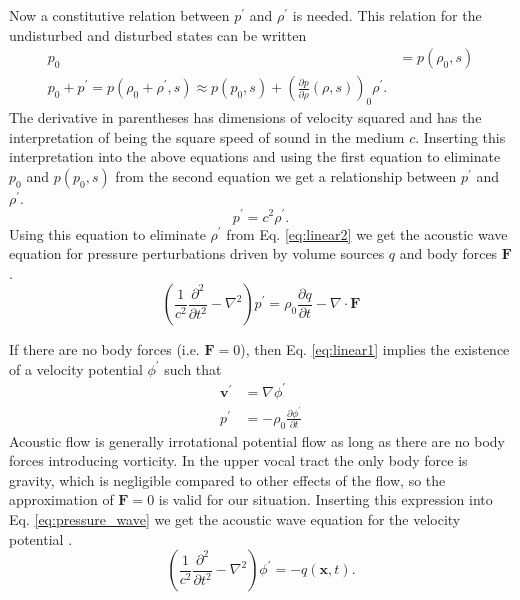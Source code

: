 \documentclass[12pt, letter]{report}
\begin{document}
Now a constitutive relation between $p^{'}$ and $\rho^{'}$ is needed. This relation for the undisturbed and disturbed states can be written
\begin{equation}
\begin{split}
p_0 &= p(\rho_0, s) \\
p_0 + p^{'} = p(\rho_0+\rho^{'},s) \approx p(p_0, s) + \left( \frac{\partial p}{\partial \rho}(\rho,s) \right)_0 \rho^{'}.
\end{split}
\end{equation}
The derivative in parentheses has dimensions of velocity squared and has the interpretation of being the square speed of sound in the medium $c$. Inserting this interpretation into the above equations and using the first equation to eliminate $p_0$ and $p(p_0, s)$ from the second equation we get a relationship between $ p^{'}$ and $\rho^{'}$.
\begin{equation} 
p^{'} = c^2 \rho^{'}.
\end{equation}
Using this equation to eliminate $\rho^{'}$ from Eq. \ref{eq:linear2} we get the acoustic wave equation for pressure perturbations driven by volume sources $q$ and body forces $\textbf{F}$.
\begin{equation} 
\label{eq:pressure_wave}
\left( \frac{1}{c^2}\frac{\partial^2 }{\partial t^2} - \nabla^2 \right)p^{'}=\rho_0 \frac{\partial q}{\partial t} - \nabla \cdot \textbf{F}
\end{equation}

If there are no body forces (i.e. $\textbf{F}=0$), then Eq. \ref{eq:linear1} implies the existence of a velocity potential $\phi^{'}$ such that
\begin{equation}
\label{eq:velocity_potential}
\begin{split}
\textbf{v}^{'} &=\nabla \phi^{'} \\
p^{'} &= -\rho_0 \frac{\partial \phi^{'}}{\partial t}
\end{split}
\end{equation}
Acoustic flow is generally irrotational potential flow as long as there are no body forces introducing vorticity. In the upper vocal tract the only body force is gravity, which is negligible compared to other effects of the flow, so the approximation of $\textbf{F}=0$ is valid for our situation. Inserting this expression into Eq. \ref{eq:pressure_wave} we get the acoustic wave equation for the velocity potential \cite{howe2003theory}.
\begin{equation}
\label{eq:potential_wave}
\left( \frac{1}{c^2}\frac{\partial^2 }{\partial t^2} - \nabla^2 \right)\phi^{'}= -q(\textbf{x}, t).
\end{equation}
\end{document}
